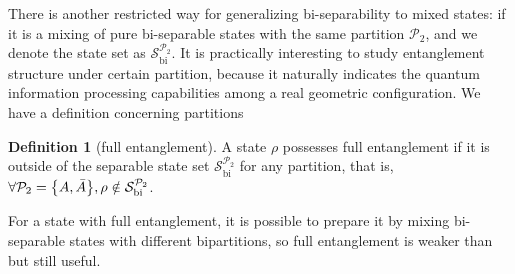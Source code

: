 \documentclass[
aps,
pra,
twocolumn,
floatfix,
]{revtex4-2}
\theoremstyle{plain}
\theoremstyle{definition}
\newtheorem{definition}{Definition}
\newtheorem{remark}{Remark}
\newcommand{\dm}{\rho}
\newcommand{\bi}{\text{bi}}
\newcommand{\separable}{\mathcal{S}}
\newcommand{\ppartition}{\mathcal{P}}
\begin{document}
There is another restricted way for generalizing bi-separability to mixed states: 
if it is a mixing of pure bi-separable states with the same partition $\ppartition_2$, 
and we denote the state set as $\separable_{\bi}^{\ppartition_2}$. 
It is practically interesting to study entanglement structure under certain partition,
because it naturally indicates the quantum information processing capabilities among a real geometric configuration.
We have a definition concerning partitions
\begin{definition}[full entanglement]\label{def:full_entanglement}
	A state $\dm$ possesses full entanglement
	if it is outside of the separable state set $\separable_{\bi}^{\ppartition_2}$ for any partition,
	that is, $\forall \ppartition_2 = \qty{A,\bar{A}},\dm \notin \separable_\bi^{\ppartition_2}$.
\end{definition}
For a state with full entanglement, it is possible to prepare it by mixing bi-separable states with different bipartitions,
so full entanglement is weaker than  but still useful.


\end{document}
